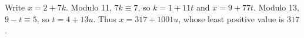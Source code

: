 Write $x=2+7k$. Modulo 11, $7k\equiv7$, so $k=1+11t$ and $x=9+77t$. Modulo 13, $9-t\equiv5$, so $t=4+13u$. Thus $x=317+1001u$, whose least positive value is $\boxed{317}$.
